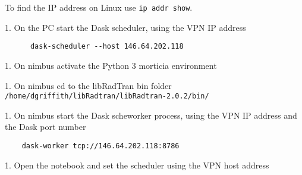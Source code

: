     To find the IP address on Linux use \lstinline{ip addr show}.


1. On the PC start the Dask scheduler, using the VPN IP address


\begin{lstlisting}
      dask-scheduler --host 146.64.202.118
\end{lstlisting}

1. On nimbus activate the Python 3 morticia environment 

1. On nimbus cd to the libRadTran bin folder  \lstinline{/home/dgriffith/libRadtran/libRadtran-2.0.2/bin/}

1. On nimbus start the Dask scheworker process, using the VPN IP address and the Dask port number

\begin{lstlisting}
    dask-worker tcp://146.64.202.118:8786
\end{lstlisting}

1. Open the notebook and set the scheduler using the VPN host address



